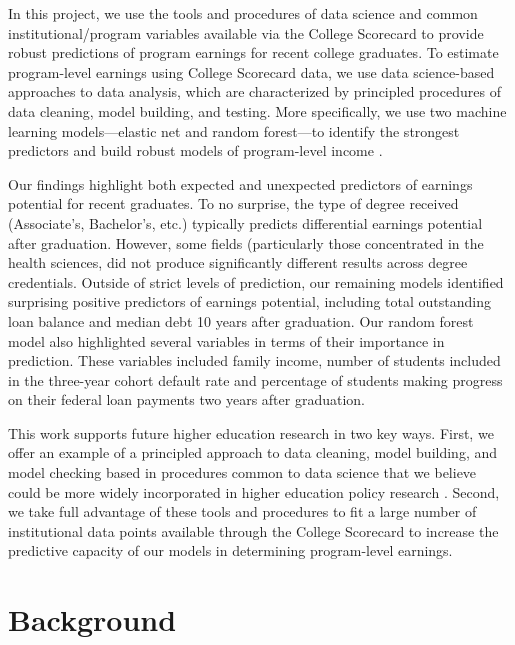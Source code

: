 \documentclass[a4paper, 12pt]{article}
\begin{document}
In this project, we use the tools and procedures of data science and common institutional/program variables available via the College Scorecard to provide robust predictions of program earnings for recent college graduates. To estimate program-level earnings using College Scorecard data, we use data science-based approaches to data analysis, which are characterized by principled procedures of data cleaning, model building, and testing. More specifically, we use two machine learning models---elastic net and random forest---to identify the strongest predictors and build robust models of program-level income \parencite{Hastie_etal_2016, Kuhn_Silge_2022}.

Our findings highlight both expected and unexpected predictors of earnings potential for recent graduates. To no surprise, the type of degree received (Associate's, Bachelor's, etc.) typically predicts differential earnings potential after graduation. However, some fields (particularly those concentrated in the health sciences, did not produce significantly different results across degree credentials. Outside of strict levels of prediction, our remaining models identified surprising positive predictors of earnings potential, including total outstanding loan balance and median debt 10 years after graduation. Our random forest model also highlighted several variables in terms of their importance in prediction. These variables included family income, number of students included in the three-year cohort default rate and percentage of students making progress on their federal loan payments two years after graduation.

This work supports future higher education research in two key ways. First, we offer an example of a principled approach to data cleaning, model building, and model checking based in procedures common to data science that we believe could be more widely incorporated in higher education policy research \parencite{Kuhn_Silge_2022}. Second, we take full advantage of these tools and procedures to fit a large number of institutional data points available through the College Scorecard to increase the predictive capacity of our models in determining program-level earnings.

\section*{Background}
\end{document}
